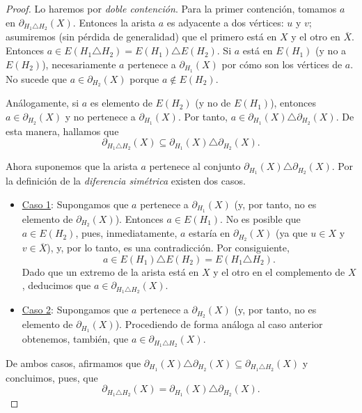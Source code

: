 \begin{proof} Lo haremos por \textit{doble contención}. Para la primer contención, tomamos $a$ en $\partial_{H_{1} \triangle H_{2}}(X)$. Entonces la arista $a$ es adyacente a dos vértices: $u$ y $v$; asumiremos (sin pérdida de generalidad) que el primero está en $X$ y el otro en $\overline{X}$. Entonces $a \in E(H_{1} \triangle H_{2})=E(H_{1}) \triangle E(H_{2})$. Si $a$ está en $E(H_{1})$ (y no a $E(H_{2})$), necesariamente $a$ pertenece a $\partial_{H_{1}}(X)$ por cómo son los vértices de $a$. No sucede que $a \in \partial_{H_{2}}(X)$ porque $a \notin E(H_{2})$. 

Análogamente, si $a$ es elemento de $E(H_{2})$ (y no de $E(H_{1})$), entonces $a \in \partial_{H_{2}}(X)$ y no pertenece a $\partial_{H_{1}}(X)$. Por tanto, $a \in \partial_{H_{1}}(X) \triangle \partial_{H_{2}}(X)$. De esta manera, hallamos que $$\partial_{H_{1} \triangle H_{2}}(X) \subseteq \partial_{H_{1}}(X) \triangle \partial_{H_{2}}(X).$$

Ahora suponemos que la arista $a$ pertenece al conjunto $\partial_{H_{1}}(X) \triangle \partial_{H_{2}}(X)$. Por la definición de la \textit{diferencia simétrica} existen dos casos.
\begin{itemize}
    \item \underline{Caso 1}: Supongamos que $a$ pertenece a $\partial_{H_{1}}(X)$ (y, por tanto, no es elemento de $\partial_{H_{2}}(X)$). Entonces $a \in E(H_{1})$. No es posible que $a \in E(H_{2})$, pues, inmediatamente, $a$ estaría en $\partial_{H_{2}}(X)$ (ya que $u \in X$ y $v \in \overline{X}$), y, por lo tanto, es una contradicción. Por consiguiente, $$a \in E(H_{1}) \triangle E(H_{2}) = E(H_{1} \triangle H_{2}).$$ Dado que un extremo de la arista está en $X$ y el otro en el complemento de $X$, deducimos que $a \in \partial_{H_{1} \triangle H_{2}}(X)$.
    
    \item \underline{Caso 2}: Supongamos que $a$ pertenece a $\partial_{H_{2}}(X)$ (y, por tanto, no es elemento de $\partial_{H_{1}}(X)$). Procediendo de forma análoga al caso anterior obtenemos, también, que $a \in \partial_{H_{1} \triangle H_{2}}(X)$.
\end{itemize}
De ambos casos, afirmamos que $\partial_{H_{1}}(X) \triangle \partial_{H_{2}}(X) \subseteq \partial_{H_{1} \triangle H_{2}}(X)$ y concluimos, pues, que $$\partial_{H_{1} \triangle H_{2}}(X) = \partial_{H_{1}}(X) \triangle \partial_{H_{2}}(X).$$

\end{proof}

